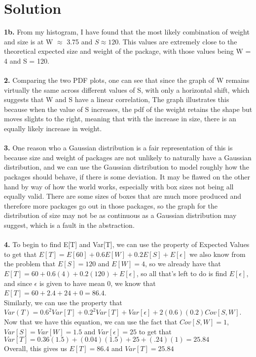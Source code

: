 \documentclass{harvardml}
\theoremstyle{definition}
\theoremstyle{plain}
\newenvironment{solution}
  {\color{blue}\section*{Solution}}
{}
\begin{document}
\begin{solution}
	\textbf{1b.} From my histogram, I have found that the most likely combination of weight and size is 
    at W $\approx$ 3.75 and $S \approx 120$. This values are extremely close to the theoretical expected size and weight of the package, with those values being W = 4 and S = 120. \\\\

    \textbf{2.} Comparing the two PDF plots, one can see that since the graph of W remains virtually the same across different values of S, with only a horizontal shift, which suggests that W and S have a linear correlation,
    The graph illustrates this because when the value of S increases, the pdf of the weight retains the shape but moves slights to the right, meaning that with the increase in size, there is an equally 
    likely increase in weight. \\\\

    \textbf{3.} One reason who a Gaussian distribution is a fair representation of this is because size and weight of packages are not unlikely to naturally have a Gaussian distribution,
    and we can use the Gaussian distribution to model roughly how the packages should behave, if there is some deviation. It may be flawed on the other hand by way of how the world works, 
    especially with box sizes not being all equally valid. There are some sizes of boxes that are much more produced and therefore more packages go out in those packages, so the graph for the distribution
    of size may not be as continuous as a Gaussian distribution may suggest, which is a fault in the abstraction. \\\\

    \textbf{4.} To begin to find E[T] and Var[T], we can use the property of Expected Values to get that $E[T] = E[60] + 0.6E[W] + 0.2E[S] + E[\epsilon]$ 
    we also know from the problem that $E[S] = 120$ and $E[W] = 4$, so we already have that $E[T] = 60 + 0.6(4) + 0.2(120) + E[\epsilon]$, so all that's left to do is find $E[\epsilon]$, and 
    since $\epsilon$ is given to have mean 0, we know that $E[T] = 60 + 2.4 + 24 + 0 = 86.4$. \\
    Similarly, we can use the property that $Var(T) = 0.6^2 Var[T] + 0.2^2 Var[T] + Var[\epsilon] + 2(0.6)(0.2)Cov[S,W]$. Now that we have this equation, we can use the
    fact that $Cov[S,W] = 1$, $Var[S] = Var[W] = 1.5$ and $Var[\epsilon] = 25$ to get that $Var[T] = 0.36(1.5) + (0.04)(1.5) + 25 + (.24)(1) = 25.84$ \\
    Overall, this gives us $E[T] = 86.4$ and $Var[T] = 25.84$
\end{solution}
\end{document}
